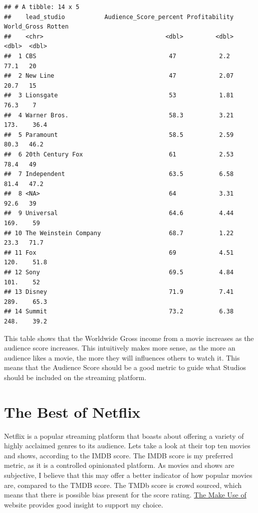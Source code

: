 \documentclass[11pt,preprint, authoryear]{elsarticle}
\numberwithin{equation}{section}
\numberwithin{figure}{section}
\numberwithin{table}{section}
\begin{document}
\begin{verbatim}
## # A tibble: 14 x 5
##    lead_studio           Audience_Score_percent Profitability World_Gross Rotten
##    <chr>                                  <dbl>         <dbl>       <dbl>  <dbl>
##  1 CBS                                     47            2.2         77.1   20  
##  2 New Line                                47            2.07        20.7   15  
##  3 Lionsgate                               53            1.81        76.3    7  
##  4 Warner Bros.                            58.3          3.21       173.    36.4
##  5 Paramount                               58.5          2.59        80.3   46.2
##  6 20th Century Fox                        61            2.53        78.4   49  
##  7 Independent                             63.5          6.58        81.4   47.2
##  8 <NA>                                    64            3.31        92.6   39  
##  9 Universal                               64.6          4.44       169.    59  
## 10 The Weinstein Company                   68.7          1.22        23.3   71.7
## 11 Fox                                     69            4.51       120.    51.8
## 12 Sony                                    69.5          4.84       101.    52  
## 13 Disney                                  71.9          7.41       289.    65.3
## 14 Summit                                  73.2          6.38       248.    39.2
\end{verbatim}

This table shows that the Worldwide Gross income from a movie increases
as the audience score increases. This intuitively makes more sense, as
the more an audience likes a movie, the more they will influences others
to watch it. This means that the Audience Score should be a good metric
to guide what Studios should be included on the streaming platform.

\hypertarget{the-best-of-netflix}{%
\section{The Best of Netflix}\label{the-best-of-netflix}}

Netflix is a popular streaming platform that boasts about offering a
variety of highly acclaimed genres to its audience. Lets take a look at
their top ten movies and shows, according to the IMDB score. The IMDB
score is my preferred metric, as it is a controlled opinionated
platform. As movies and shows are subjective, I believe that this may
offer a better indicator of how popular movies are, compared to the TMDB
score. The TMDb score is crowd sourced, which means that there is
possible bias present for the score rating.
\href{https://www.makeuseof.com/tag/best-alternative-imdb/}{The Make Use
of} website provides good insight to support my choice.
\end{document}
